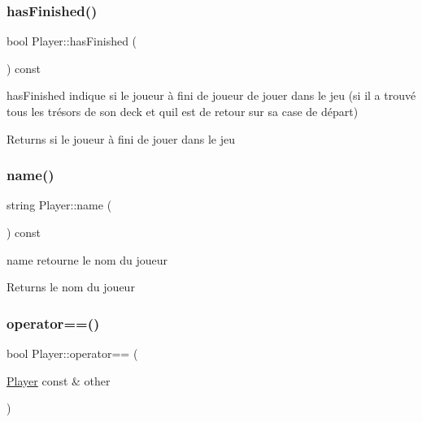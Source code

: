 \subsubsection{\texorpdfstring{hasFinished()}{hasFinished()}}
{\footnotesize\ttfamily bool Player\+::has\+Finished (\begin{DoxyParamCaption}{ }\end{DoxyParamCaption}) const}



has\+Finished indique si le joueur à fini de joueur de jouer dans le jeu (si il a trouvé tous les trésors de son deck et qu\textquotesingle{}il est de retour sur sa case de départ) 

\begin{DoxyReturn}{Returns}
si le joueur à fini de jouer dans le jeu 
\end{DoxyReturn}
\mbox{\label{class_player_a6cc57f75295fa8f11f634a2904e9653b}} 
\subsubsection{\texorpdfstring{name()}{name()}}
{\footnotesize\ttfamily string Player\+::name (\begin{DoxyParamCaption}{ }\end{DoxyParamCaption}) const\hspace{0.3cm}{\ttfamily [inline]}}



name retourne le nom du joueur 

\begin{DoxyReturn}{Returns}
le nom du joueur 
\end{DoxyReturn}
\mbox{\label{class_player_a6a14a7da6a14d152fda0374aabdef6cb}} 
\subsubsection{\texorpdfstring{operator==()}{operator==()}}
{\footnotesize\ttfamily bool Player\+::operator== (\begin{DoxyParamCaption}\item[{\mbox{\hyperlink{class_player}{Player}} const \&}]{other }\end{DoxyParamCaption})\hspace{0.3cm}{\ttfamily [inline]}}



